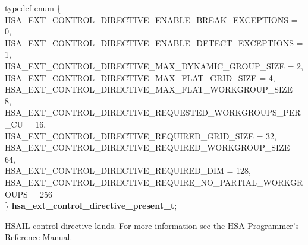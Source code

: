 \documentclass[final,oneside]{book}
\newcommand{\reftyp}[1]{#1}
\newcommand{\refenu}[1]{\reftyp{#1}}
\newenvironment{mylongtable}{\rowcolors{0}{lightgray}{lightgray}\longtable} {
\endlongtable}
\begin{document}
\vspace{-5.5mm}\begin{mylongtable}{@{}p{\textwidth}}
\rule{0pt}{3ex}typedef enum \{\\\hspace{1.7em}\hypertarget{group__ext-finalizer_1gga143d9e622dfd7889d52fb5eb5ed1ffdba1c209f3a9fd22b358006c221303f8893}{\refenu{HSA_\-EXT_\-CONTROL_\-DIRECTIVE_\-ENABLE_\-BREAK_\-EXCEPTIONS}} = 0,\\
\hspace{1.7em}\hypertarget{group__ext-finalizer_1gga143d9e622dfd7889d52fb5eb5ed1ffdba5f6e061c9abd08976ee6f4c4ee48f30a}{\refenu{HSA_\-EXT_\-CONTROL_\-DIRECTIVE_\-ENABLE_\-DETECT_\-EXCEPTIONS}} = 1,\\
\hspace{1.7em}\hypertarget{group__ext-finalizer_1gga143d9e622dfd7889d52fb5eb5ed1ffdba7787b99c887699ca6fe8d1cd4de3477e}{\refenu{HSA_\-EXT_\-CONTROL_\-DIRECTIVE_\-MAX_\-DYNAMIC_\-GROUP_\-SIZE}} = 2,\\
\hspace{1.7em}\hypertarget{group__ext-finalizer_1gga143d9e622dfd7889d52fb5eb5ed1ffdba8f84c9f5303be293df76bf82b002299c}{\refenu{HSA_\-EXT_\-CONTROL_\-DIRECTIVE_\-MAX_\-FLAT_\-GRID_\-SIZE}} = 4,\\
\hspace{1.7em}\hypertarget{group__ext-finalizer_1gga143d9e622dfd7889d52fb5eb5ed1ffdbaa0e6d7d860284c6cadde5c7e9db66968}{\refenu{HSA_\-EXT_\-CONTROL_\-DIRECTIVE_\-MAX_\-FLAT_\-WORKGROUP_\-SIZE}} = 8,\\
\hspace{1.7em}\hypertarget{group__ext-finalizer_1gga143d9e622dfd7889d52fb5eb5ed1ffdbae6659470b66232e7ec4a749a032dc95d}{\refenu{HSA_\-EXT_\-CONTROL_\-DIRECTIVE_\-REQUESTED_\-WORKGROUPS_\-PER_\-CU}} = 16,\\
\hspace{1.7em}\hypertarget{group__ext-finalizer_1gga143d9e622dfd7889d52fb5eb5ed1ffdbaa9878485a06df4090cba80c85acb32be}{\refenu{HSA_\-EXT_\-CONTROL_\-DIRECTIVE_\-REQUIRED_\-GRID_\-SIZE}} = 32,\\
\hspace{1.7em}\hypertarget{group__ext-finalizer_1gga143d9e622dfd7889d52fb5eb5ed1ffdbab26301028f39a1ac099aae9e74251438}{\refenu{HSA_\-EXT_\-CONTROL_\-DIRECTIVE_\-REQUIRED_\-WORKGROUP_\-SIZE}} = 64,\\
\hspace{1.7em}\hypertarget{group__ext-finalizer_1gga143d9e622dfd7889d52fb5eb5ed1ffdba87989d5d2c63b0bb44b15e0788bfe850}{\refenu{HSA_\-EXT_\-CONTROL_\-DIRECTIVE_\-REQUIRED_\-DIM}} = 128,\\
\hspace{1.7em}\hypertarget{group__ext-finalizer_1gga143d9e622dfd7889d52fb5eb5ed1ffdba5b5049bc2b376e60b9b92337e343ee18}{\refenu{HSA_\-EXT_\-CONTROL_\-DIRECTIVE_\-REQUIRE_\-NO_\-PARTIAL_\-WORKGROUPS}} = 256\\
\} \hypertarget{group__ext-finalizer_1ga143d9e622dfd7889d52fb5eb5ed1ffdb}{\textbf{hsa_\-ext_\-control_\-directive_\-present_\-t}};\rule[-2ex]{0pt}{0pt}\end{mylongtable}
\vspace{-5mm}HSAIL control directive kinds. For more information see the HSA Programmer's Reference Manual.
\end{document}
